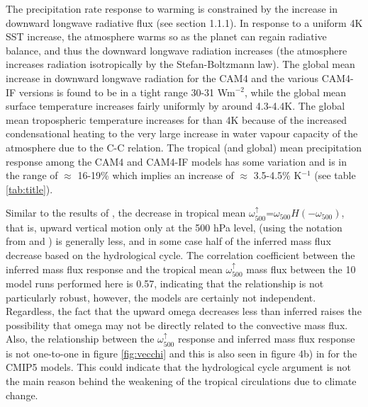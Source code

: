 \documentclass[letterpaper,12pt,titlepage,oneside,final]{book}
\begin{document}
The precipitation rate response to warming is constrained by the increase in downward longwave radiative flux (see section 1.1.1). In response to a uniform 4K SST increase, the atmosphere warms so as the planet can regain radiative balance, and thus the downward longwave radiation increases (the atmosphere increases radiation isotropically by the Stefan-Boltzmann law). The global mean increase in downward longwave radiation for the CAM4 and the various CAM4-IF versions is found to be in a tight range 30-31 Wm$^{-2}$, while the global mean surface temperature increases fairly uniformly by around 4.3-4.4K. The global mean tropospheric temperature increases for than 4K because of the increased condensational heating to the very large increase in water vapour capacity of the atmosphere due to the C-C relation. The tropical (and global) mean precipitation response among the CAM4 and CAM4-IF models has some variation and is in the range of $\approx$ 16-19\% which implies an increase of $\approx$ 3.5-4.5\% K$^{-1}$ (see table \ref{tab:title}).

Similar to the results of \citep{vecchi_global_2007}, the decrease in tropical mean $\omega_{500}^{\uparrow}$=$\omega_{500}{H(-\omega_{500})}$, that is, upward vertical motion only at the 500 hPa level, (using the notation from \cite{schneider_water_2010} and \cite{merlis_changes_2011}) is generally less, and in some case half of the inferred mass flux decrease based on the hydrological cycle. The correlation coefficient between the inferred mass flux response and the tropical mean $\omega_{500}^{\uparrow}$ mass flux between the 10 model runs performed here is 0.57, indicating that the relationship is not particularly robust, however, the models are certainly not independent. Regardless, the fact that the upward omega decreases less than inferred raises the possibility that omega may not be directly related to the convective mass flux. Also, the relationship between the $\omega_{500}^{\uparrow}$ response and inferred mass flux response is not one-to-one in figure \ref{fig:vecchi} and this is also seen in figure 4b) in \citep{vecchi_global_2007} for the CMIP5 models. This could indicate that the hydrological cycle argument is not the main reason behind the weakening of the tropical circulations due to climate change.
\end{document}

